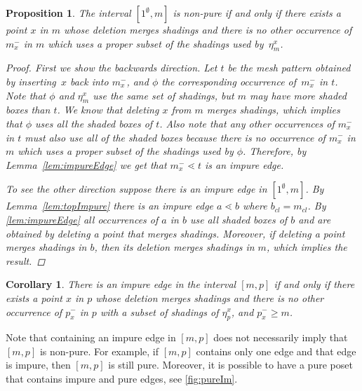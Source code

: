 \documentclass[preprint,11pt]{elsarticle}
\newtheorem{cor}[thm]{Corollary}\crefname{cor}{Corollary}{Corollaries}
\newtheorem{prop}[thm]{Proposition}\crefname{prop}{Proposition}{Propositions}
\newcommand\cl[1]{#1_{cl}}
\newcommand\occX[2]{\eta^{#2}_{#1}}
\newcommand\mX[2]{#1^{-}_{#2}}
\numberwithin{equation}{section}
\numberwithin{figure}{section}
\numberwithin{thm}{section}
\begin{document}
\begin{prop}
The interval $[1^\emptyset,m]$ is non-pure if and
only if there exists a point $x$ in $m$ whose deletion merges shadings and
there is no other occurrence of $\mX{m}{x}$ in $m$ which uses a proper subset of the shadings
used by~$\occX{m}{x}$.
\begin{proof}
First we show the backwards direction. Let $t$  be the mesh pattern obtained by
inserting~$x$ back into $\mX{m}{x}$, and $\phi$ the corresponding occurrence of~$\mX{m}{x}$
in $t$. Note that $\phi$ and $\occX{m}{x}$ use the same set of shadings,
but $m$ may have more shaded boxes than $t$.
We know that deleting $x$ from $m$ merges shadings, which implies that $\phi$ uses all the
shaded boxes of $t$. 
Also note that any other occurrences of $\mX{m}{x}$ in $t$ must also use all of the shaded boxes
because there is no occurrence of $\mX{m}{x}$ in $m$ which uses a proper subset of the shadings
used by $\phi$. Therefore, by Lemma~\ref{lem:impureEdge} we get that
$\mX{m}{x}\lessdot t$ is an impure edge.

To see the other direction suppose there is an impure edge in $[1^{\emptyset},m]$. By
Lemma~\ref{lem:topImpure} there is an impure edge $a\lessdot b$ where
$\cl{b}=\cl{m}$. By \cref{lem:impureEdge} all occurrences of $a$ in
$b$ use all shaded boxes of $b$ and are obtained by deleting a point that merges
shadings. Moreover, if deleting a point merges shadings in $b$, then its deletion merges shadings in $m$,
which implies the result.
\end{proof}
\end{prop}

\begin{cor}
There is an impure edge in the interval $[m,p]$ if and only if there exists a
point $x$ in $p$ whose deletion merges shadings and there is no other
occurrence of $\mX{p}{x}$ in $p$ with a subset of shadings of $\occX{p}{x}$, and
$\mX{p}{x}\ge m$.
\end{cor}

Note that containing an impure edge in $[m,p]$ does not necessarily imply
that $[m,p]$ is non-pure. For example, if $[m,p]$ contains only one edge and
that edge is impure, then $[m,p]$ is still pure. Moreover, it is possible
to have a pure poset that contains impure and pure edges, see \cref{fig:pureIm}.
\end{document}
